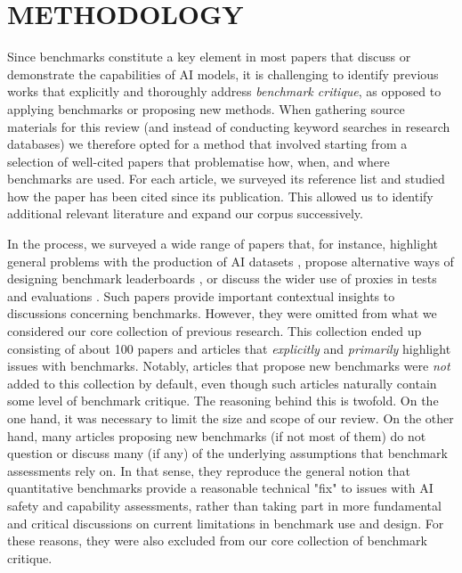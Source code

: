 \section{METHODOLOGY}

Since benchmarks constitute a key element in most papers that discuss or demonstrate the capabilities of AI models, it is challenging to identify previous works that explicitly and thoroughly address \textit{benchmark critique}, as opposed to applying benchmarks or proposing new methods. When gathering source materials for this review (and instead of conducting keyword searches in research databases) we therefore opted for a method that involved starting from a selection of well-cited papers that problematise how, when, and where benchmarks are used. For each article, we surveyed its reference list and studied how the paper has been cited since its publication. This allowed us to identify additional relevant literature and expand our corpus successively. 

In the process, we surveyed a wide range of papers that, for instance, highlight general problems with the production of AI datasets \cite{mitchell2019,orr2024b}, propose alternative ways of designing benchmark leaderboards \cite{rodriguez2021,liu2021}, or discuss the wider use of proxies in tests and evaluations \cite{mulvin2021,pinch1993,marres2020}.
Such papers provide important contextual insights to discussions concerning benchmarks. However, they were omitted from what we considered our core collection of previous research. This collection ended up consisting of about 100 papers and articles that \textit{explicitly} and \textit{primarily} highlight issues with benchmarks. Notably, articles that propose new benchmarks were \textit{not} added to this collection by default, even though such articles naturally contain some level of benchmark critique.
The reasoning behind this is twofold. On the one hand, it was necessary to limit the size and scope of our review. On the other hand, many articles proposing new benchmarks (if not most of them) do not question or discuss many (if any) of the underlying assumptions that benchmark assessments rely on.
In that sense, they reproduce the general notion that quantitative benchmarks provide a reasonable technical "fix" to issues with AI safety and capability assessments, rather than taking part in more fundamental and critical discussions on current limitations in benchmark use and design. For these reasons, they were also excluded from our core collection of benchmark critique. 

